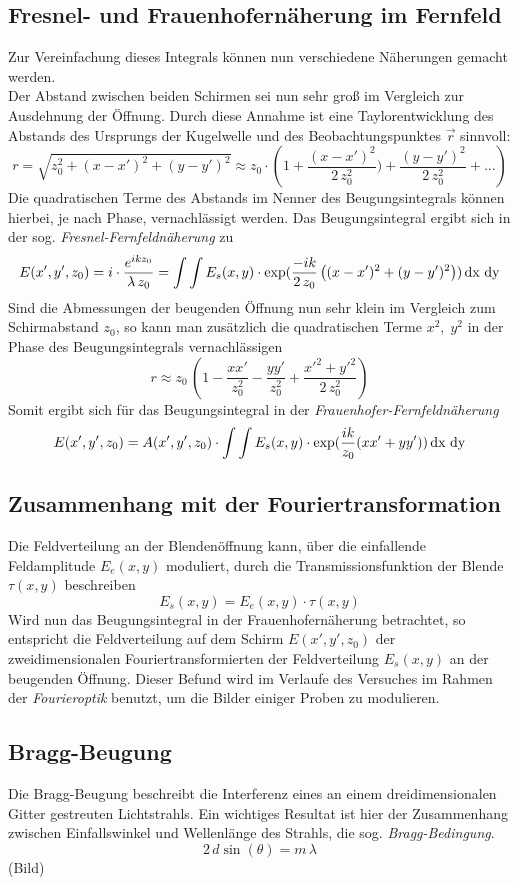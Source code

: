         \subsection*{Fresnel- und Frauenhofernäherung im Fernfeld}
Zur Vereinfachung dieses Integrals können nun verschiedene Näherungen gemacht werden. \\
Der Abstand zwischen beiden Schirmen sei nun sehr groß im Vergleich 
zur Ausdehnung der Öffnung. Durch diese Annahme ist eine Taylorentwicklung des Abstands
des Ursprungs der Kugelwelle und des Beobachtungspunktes $\vec{r}$ sinnvoll:
\[
    r = \sqrt{z_0^2 + (x-x')^2 + (y-y')^2} \approx z_0 \cdot \left( 1 + 
    \frac{(x-x')^2}{2\,z_0^2}) + \frac{(y-y')^2}{2 \, z_0^2} + \dots \right)
\]
Die quadratischen Terme des Abstands im Nenner des Beugungsintegrals können
hierbei, je nach Phase, vernachlässigt werden. Das Beugungsintegral ergibt sich
in der sog. \emph{Fresnel-Fernfeldnäherung} zu
\[
    E(x',y',z_0) = i \cdot \frac{e^{ikz_0}}{\lambda \, z_0} 
    = \int \int E_s(x,y) \cdot \exp(
        \frac{-ik}{2\,z_0} \left((x-x')^2 + (y-y')^2\right)
    ) \,\text{dx}\, \, \text{dy}
\]
Sind die Abmessungen der beugenden Öffnung nun sehr klein im Vergleich zum 
Schirmabstand $z_0$, so kann man zusätzlich die quadratischen Terme $x^2, \; y^2$ 
in der Phase des Beugungsintegrals vernachlässigen
\[
    r \approx z_0 \, \left( 1 - \frac{xx'}{z_0^2} - \frac{yy'}{z_0^2} 
        + \frac{x'^2+y'^2}{2\,z_0^2}
        \right)
\]
Somit ergibt sich für das Beugungsintegral in der \emph{Frauenhofer-Fernfeldnäherung}
\[
    E(x',y',z_0) = A(x',y',z_0) \cdot \int \int E_s(x,y) \cdot
    \exp(\frac{ik}{z_0}(xx'+yy')) \,\text{dx}\, \, \text{dy}
\]

    \subsection*{Zusammenhang mit der Fouriertransformation}
Die Feldverteilung an der Blendenöffnung kann, über die einfallende Feldamplitude 
$E_e(x,y)$ moduliert, durch die Transmissionsfunktion der Blende $\tau(x,y)$ beschreiben 
\[
    E_s(x,y) = E_e(x,y) \cdot \tau(x,y)
\]
Wird nun das Beugungsintegral in der Frauenhofernäherung betrachtet, so 
entspricht die Feldverteilung auf dem Schirm $E(x',y',z_0)$ der zweidimensionalen 
Fouriertransformierten der Feldverteilung $E_s(x,y)$ an der beugenden Öffnung.
Dieser Befund wird im Verlaufe des Versuches im Rahmen der \emph{Fourieroptik}
benutzt, um die Bilder einiger Proben zu modulieren.

        \subsection*{Bragg-Beugung}
Die Bragg-Beugung beschreibt die Interferenz eines an einem dreidimensionalen 
Gitter gestreuten Lichtstrahls. Ein wichtiges Resultat ist hier der Zusammenhang 
zwischen Einfallswinkel und Wellenlänge des Strahls, die sog. \emph{Bragg-Bedingung}.
\[
    2\,d\sin(\theta) = m \, \lambda
\]
(Bild)

